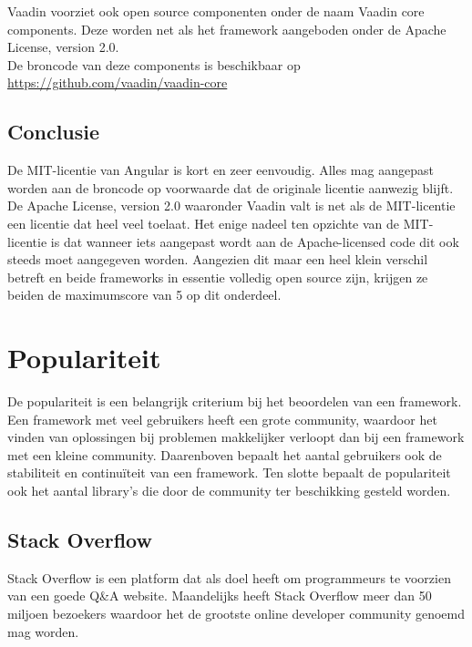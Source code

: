 Vaadin voorziet ook open source componenten onder de naam Vaadin core components. Deze worden net als het framework aangeboden onder de Apache License, version 2.0.
\\ De broncode van deze components is beschikbaar op 
\\ \url{https://github.com/vaadin/vaadin-core }

\subsection{Conclusie}
De MIT-licentie van Angular is kort en zeer eenvoudig. Alles mag aangepast worden aan de broncode op voorwaarde dat de originale licentie aanwezig blijft. 
De Apache License, version 2.0 waaronder Vaadin valt is net als de MIT-licentie een licentie dat heel veel toelaat. Het enige nadeel ten opzichte van de MIT-licentie is dat wanneer iets aangepast wordt aan de Apache-licensed code dit ook steeds moet aangegeven worden.
Aangezien dit maar een heel klein verschil betreft en beide frameworks in essentie volledig open source zijn, krijgen ze beiden de maximumscore van 5 op dit onderdeel.

\section{Populariteit}
De populariteit is een belangrijk criterium bij het beoordelen van een framework. Een framework met veel gebruikers heeft een grote community, waardoor het vinden van oplossingen bij problemen makkelijker verloopt dan bij een framework met een kleine community. Daarenboven bepaalt het aantal gebruikers ook de stabiliteit en continuïteit van een framework. Ten slotte bepaalt de populariteit ook het aantal library's die door de community ter beschikking gesteld worden.
\subsection{Stack Overflow}
Stack Overflow is een platform dat als doel heeft om programmeurs te voorzien van een goede Q\&A website. Maandelijks heeft Stack Overflow meer dan 50 miljoen bezoekers waardoor het de grootste online developer community genoemd mag worden. 
